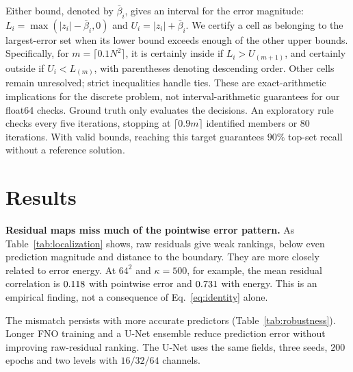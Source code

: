 \documentclass{article}
\begin{document}
Either bound, denoted by $\bar\beta_i$, gives an interval for the error magnitude:
$L_i=\max(|z_i|-\bar\beta_i,0)$ and $U_i=|z_i|+\bar\beta_i$. We certify a cell as belonging to the
largest-error set when its lower bound exceeds enough of the other upper bounds. Specifically,
for $m=\lceil0.1N^2\rceil$, it is certainly inside if $L_i>U_{(m+1)}$, and certainly outside if
$U_i<L_{(m)}$, with parentheses denoting descending order. Other cells remain unresolved; strict inequalities handle ties. These are exact-arithmetic implications
for the discrete problem, not interval-arithmetic guarantees for our float64 checks. Ground truth
only evaluates the decisions. An exploratory rule checks every five iterations, stopping at
$\lceil0.9m\rceil$ identified members or $80$ iterations. With valid bounds, reaching this target
guarantees $90\%$ top-set recall without a reference solution.

\section{Results}
\begin{table}[ht]
\centering
\caption{Mean spatial Spearman with $|e|$ on fresh $32^2$ binary fields, with $95\%$ field-bootstrap
intervals. Equal iterations are not equal work; $1.000$ denotes rounding, not exact recovery.}
\label{tab:localization}

\end{table}

\textbf{Residual maps miss much of the pointwise error pattern.}
As Table~\ref{tab:localization} shows, raw residuals give weak rankings, below even prediction
magnitude and distance to the boundary. They are more closely related to error energy. At $64^2$
and $\kappa=500$, for example, the mean residual correlation is $0.118$ with
pointwise error and $0.731$ with energy. This is an empirical finding, not a consequence of Eq.~\eqref{eq:identity} alone.

The mismatch persists with more accurate predictors (Table~\ref{tab:robustness}). Longer FNO
training and a U-Net ensemble \citep{ronneberger2015unet} reduce prediction error without improving
raw-residual ranking. The U-Net uses the same fields, three seeds, $200$ epochs and two levels
with $16/32/64$ channels.

\begin{table}[!htbp]
\centering
\caption{Controls at $32^2$, $\kappa=100$: means and $95\%$ field-bootstrap intervals on $200$
fields per row. The smooth FNO is separately trained; PCG-20 uses the Poisson preconditioner.}
\label{tab:robustness}

\end{table}
\end{document}
